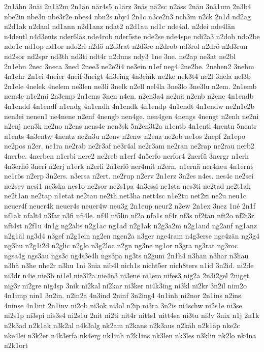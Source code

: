 {2n1ähn
3näi
2n1ä2m
2n1än
när4s5
n1ärz
3näs
nä2sc
n2äss
2näu
3nä1um
2n3b4
nbe2in
nbe3n
nbe3r2e
nbes4
nbu2s
nby4
2n1c
n3ce2n3
nch3m
n2ck
2n1d
nd2ag
n2d1ak
n2danl
nd1ann
n2d1anz
ndat2
n2d1au
nd1c
nde4al.
n2dei
nde4län
n4dentl
n4d3ents
nder6läs
nde4rob
nder5ste
nde2se
nde4spe
ndi2a3
n2dob
ndo2be
ndo1c
nd1op
nd1or
ndo2ri
n2dö
n2d3rat
n2d3re
n2drob
nd3rol
n2drö
n2d3run
nd2sor
nd2spr
nd3th
nd3ti
ndt4r
n2duns
ndy3
1ne
3ne.
ne2ap
ne3at
ne2bl
2n1ebn
2nec
3neca
3ned
2nee3
ne2e2i4
ne3ein
n1ef
neg4
2ne2he.
2nehen2
3nehm
4n1ehr
2n1ei
4neier
4neif
3neigt
4n3eing
4n3eink
ne2ke
nek3t4
ne2l
3nela
nel3b
2n1ele
4nelek
4nelem
ne3len
ne3li
3nelk
n2ell
nel4la
3ne3lo
3ne3lu
n2em.
2n1emb
nem4e
n1e2mi
2n3emp
2n1ems
3nen
n4en.
n2en3a4
ne2nä
n2enb
n2enc
4n1endb
4n1endd
4n1endf
n1endg
4n1endh
4n1endk
4n1endp
4n1endt
4n1endw
ne2n1e2b
nen3ei
nenen1
ne4nene
n2enf
4nengb
nen4ge.
nen4gen
4nengs
4nengt
n2enh
ne2ni
n2enj
nen3k
ne2no
n2ens
nens4e
nen3sk
5n2en3t2a
n1entb
4n1entl
4nentn
5nentr
n1ents
4n3entw
4nentz
ne2n3u
n2env
n2enw
n2enz
ne2ob
ne1os
2nepf
2n1epo
ne2pos
n2er.
ne1ra
ne2rab
ne2r3af
ne3r4al
ne2r3am
ne2ran
ne2rap
ne2rau
nerb2
4nerbe.
4nerben
n1erbi
nere2
ne2reb
n1erf
4n5erfo
nerfor4
2nerfü
3nergr
n1erh
4n3erhö
3neri
n2erj
n1erk
n2erli
2n1erlö
ner4mit
n2ern.
n1ernä
ner4neu
4n1ernt
ne1rös
n2erp
3n2ers.
n3ersa
n2ert.
ne2rup
n2erv
2n1erz
3n2es
n4es.
nes4c
ne2sei
ne2sev
nesi1
ne3ska
nes1o
ne2sor
ne2s1pa
4n3essi
ne1sta
nes3ti
ne2tad
ne2t1ak
ne2t1an
ne2tap
n1etat
ne2tau
ne2th
net3ha
nett4sc
n1e2tu
net2zi
ne2u
neu1c
neuer4f
neuer4k
neuer4s
neuer4w
neu3g
2n1eup
neur2
n2ew
2n1ex
3nez
1né
2n1f
nf1ak
nfalt4
n3far
n3fi
nfi4le.
nf4l
nf5lin
nf2o
nfo1s
nf4r
nf3s
nf2tan
nft2o
nf2t3r
nft4st
n2f1u
4n1g
ng2abs
n2g1ac
ng1ad
n2g1ak
n2g3a2m
n2g1and
ng2anf
ng1anz
n2g1äl
ng3d4
n3gef
n2g1ein
ng2en
ngen2a
n3ger
nge4ram
n4g3erse
nge4zän
ng3g4
ng3hu
n2g1i2d
n2glic
n2glo
n3g2loc
n2gn
ng3ne
ng1or
n3gra
ng3rat
ng3roc
ngsa4g
ngs3au
ngs3c
ng4s3e4h
ngs3pa
ng3ts
n2gum
2n1h4
n3han
n3har
n3hau
n3hä
n3he
nhe2r
n3hu
1ni
3nia
nib4l
nich1s
nicht5er
nich8ters
n1id
3n2id.
ni2de
ni3dr
n4ie
nie3b
ni1el
nie3l2a
nie4n3
ni3ene
ni1ero
nifes3
nig2a
2n3i2gel
2niget
nig3r
ni2gre
nig4sp
3nik
ni2kal
ni2kar
ni3ker
ni4k3ing
ni3kl
ni2kr
3n2il
nim2o
4n1imp
nin1
3n2in.
n2in2a
4n3ind
2ninf
3n2ing4
4n1inh
ni2nor
2n1ins
n2ins.
4ninse
4n1int
2n1inv
ni2ob
ni3ok
ni3ol
n2ip
ni3ra
3n2is
ni4schw
ni2s1e
ni3se.
ni2s1p
ni3spi
nis3s4
ni2s1u
2nit
ni2ti
nit4r
nitts1
nitt4sa
ni3tu
ni3v
3nix
n1j
2n1k
n2k3ad
n2k1ak
n3k2al
n4k3alg
nk2am
n2kans
n2k3aus
n2käh
n2k1äp
nke2c
nke4lei
n3k2er
n4k3erfa
nk4erg
nk1inh
n2k1ins
nk3len
nk3les
n3klin
nk2lo
nk4na
n2k1ort
}
